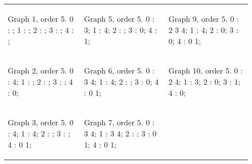 \begin{tabular}{|p{1.5in} | p{1.5in} | p{1.5in} |}
\begin{minipage}{1.5in}
\begin{datalisting}
Graph 1, order 5.
0 : ;
1 : ;
2 : ;
3 : ;
4 : ;

\end{datalisting}
\end{minipage}
&
\begin{minipage}{1.5in}
\begin{datalisting}
Graph 5, order 5.
0 : 3;
1 : 4;
2 : ;
3 : 0;
4 : 1;

\end{datalisting}
\end{minipage}
& 
\begin{minipage}{1.5in}
\begin{datalisting}
Graph 9, order 5.
0 : 2 3 4;
1 : 4;
2 : 0;
3 : 0;
4 : 0 1;

\end{datalisting}
\end{minipage}
\\
\begin{minipage}{1.5in}
\begin{datalisting}
Graph 2, order 5.
0 : 4;
1 : ;
2 : ;
3 : ;
4 : 0;

\end{datalisting}
\end{minipage}
&
\begin{minipage}{1.5in}
\begin{datalisting}
Graph 6, order 5.
0 : 3 4;
1 : 4;
2 : ;
3 : 0;
4 : 0 1;

\end{datalisting}
\end{minipage}
&
\begin{minipage}{1.5in}
\begin{datalisting}
Graph 10, order 5.
0 : 2 4;
1 : 3;
2 : 0;
3 : 1;
4 : 0;

\end{datalisting}
\end{minipage}
\\
\begin{minipage}{1.5in}
\begin{datalisting}
Graph 3, order 5.
0 : 4;
1 : 4;
2 : ;
3 : ;
4 : 0 1;

\end{datalisting}
\end{minipage}
&
\begin{minipage}{1.5in}
\begin{datalisting}
Graph 7, order 5.
0 : 3 4;
1 : 3 4;
2 : ;
3 : 0 1;
4 : 0 1;


\end{datalisting}
\end{minipage}
\end{tabular}
